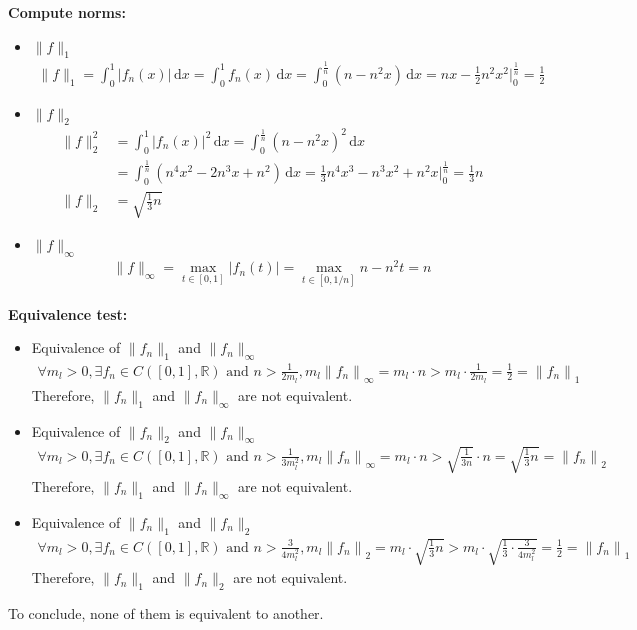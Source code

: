 \documentclass[a4paper,10.5pt]{article}
\newcommand{\R}{\mathbb{R}}
\newcommand{\dx}{\, \mathrm{d} x}
\newcommand{\norm}[1]{\left\lVert#1\right\rVert}
\begin{document}
\textbf{Compute norms:}
\begin{itemize}
\item $\|f\|_1$
\begin{align*}
	\|f\|_1 = \int_0^1 \lvert f_n(x)\rvert \dx=\int_0^1f_n(x)\dx = \int_0^{\frac{1}{n}}\left(n-n^2x\right) \dx = nx-\frac{1}{2}n^2x^2 \bigg\rvert_0^{\frac{1}{n}} = \frac{1}{2}
\end{align*}
\item $\|f\|_2$
\begin{align*}
\|f\|_2^2&=\int_0^1 \lvert f_n(x)\rvert ^2 \dx = \int_0^{\frac{1}{n}}\left(n-n^2x\right)^2\dx \\
&=\int_0^{\frac{1}{n}}\left(n^4x^2-2n^3x+n^2\right) \dx = \frac{1}{3}n^4x^3-n^3 x^2 + n^2 x \bigg\rvert_0^{\frac{1}{n}}=\frac{1}{3}n \\
\|f\|_2 &= \sqrt{\frac{1}{3}n}
\end{align*}
\item $\|f\|_\infty$
\begin{align*}
\|f\|_\infty = \max_{t \in [0,1]} \lvert f_n(t) \rvert = \max_{t\in \left[0,1/n\right]} n-n^2t=n
\end{align*}

\end{itemize}

\textbf{Equivalence test:}
\begin{itemize}
\item Equivalence of $\|f_n\|_1$ and $\|f_n\|_\infty$
\begin{align*}
\forall m_l > 0, \exists f_n \in C([0,1], \R) \text{ and } n > \frac{1}{2m_l}, m_l\norm{f_n}_\infty = m_l \cdot n > m_l \cdot \frac{1}{2m_l} = \frac{1}{2} = \norm{f_n}_1
\end{align*}
Therefore, $\|f_n\|_1$ and $\|f_n\|_\infty$ are not equivalent.
\item Equivalence of $\|f_n\|_2$ and $\|f_n\|_\infty$
\begin{align*}
\forall m_l > 0, \exists f_n \in C([0,1], \R) \text{ and } n > \frac{1}{3m_l^2}, m_l\norm{f_n}_\infty = m_l \cdot n > \sqrt{\frac{1}{3n}} \cdot n = \sqrt{\frac{1}{3}n} = \norm{f_n}_2
\end{align*}
Therefore, $\|f_n\|_1$ and $\|f_n\|_\infty$ are not equivalent.

\item Equivalence of $\|f_n\|_1$ and $\|f_n\|_2$
\begin{align*}
\forall m_l > 0, \exists f_n \in C([0,1], \R) \text{ and } n > \frac{3}{4m_l^2}, m_l\norm{f_n}_2 = m_l \cdot \sqrt{\frac{1}{3}n} > m_l \cdot \sqrt{\frac{1}{3} \cdot \frac{3}{4m_l^2}} = \frac{1}{2} = \norm{f_n}_1
\end{align*}
Therefore, $\|f_n\|_1$ and $\|f_n\|_2$ are not equivalent.
\end{itemize}
To conclude, none of them is equivalent to another.
\end{document}
